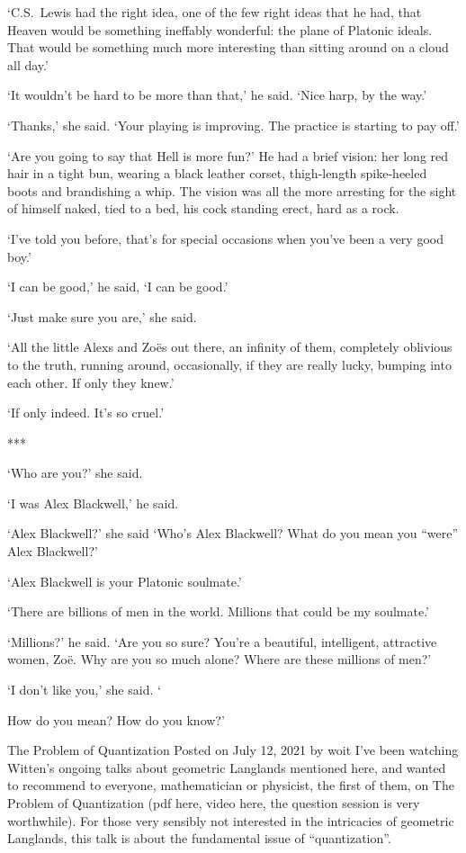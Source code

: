 `C.S.~Lewis had the right idea, one of the few right ideas that he
had, that Heaven would be something ineffably wonderful: the plane
of Platonic ideals. That would be something much more interesting than sitting around on a
cloud all day.'

`It wouldn't be hard to be more than that,' he said. `Nice harp, by the
way.'

`Thanks,' she said. `Your playing is improving. The practice is
starting to pay off.'

`Are you going to say that Hell is more fun?' He had a brief
vision: her long red hair in a tight bun, wearing a black
leather corset, thigh-length spike-heeled boots and brandishing a
whip. The vision was all the more arresting for the sight of himself
naked, tied to a bed, his cock standing erect, hard as a rock.

`I've told you before, that's for special occasions when you've been a {\twelveit very\/} good boy.'

`I can be good,' he said, `I can be good.'

`Just make sure you are,' she said.

`All the little Alexs and Zo{\"e}s out there, an infinity of them,
completely oblivious to the truth, running around, occasionally, if
they are really lucky, bumping into each other. If only they knew.'

`If only indeed. It's so cruel.'

***

`Who are you?' she said.

`I was Alex Blackwell,' he said.

`Alex Blackwell?' she said `Who's Alex Blackwell? What do you mean you
``were'' Alex Blackwell?'

`Alex Blackwell is your Platonic soulmate.'

`There are billions of men in the world. Millions that
could be my soulmate.'

`Millions?' he said. `Are you so sure? You're a beautiful, intelligent,
attractive women, Zo{\"e}. Why are you so much alone? Where are
these millions of men?'

`I don't like you,' she said. `

 How do you mean? How do you know?'


The Problem of Quantization
Posted on July 12, 2021 by woit
I’ve been watching Witten’s ongoing talks about geometric Langlands mentioned here, and wanted to recommend to everyone, mathematician or physicist, the first of them, on The Problem of Quantization (pdf here, video here, the question session is very worthwhile). For those very sensibly not interested in the intricacies of geometric Langlands, this talk is about the fundamental issue of “quantization”.


